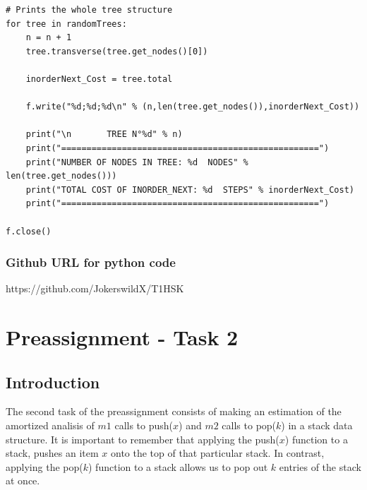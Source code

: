 \documentclass[12p]{report}
\begin{document}
\begin{lstlisting}
# Prints the whole tree structure
for tree in randomTrees:
	n = n + 1
	tree.transverse(tree.get_nodes()[0])

	inorderNext_Cost = tree.total

	f.write("%d;%d;%d\n" % (n,len(tree.get_nodes()),inorderNext_Cost))

	print("\n		TREE N°%d" % n)
	print("===================================================")
	print("NUMBER OF NODES IN TREE: %d  NODES" % len(tree.get_nodes()))
	print("TOTAL COST OF INORDER_NEXT: %d  STEPS" % inorderNext_Cost)
	print("===================================================")	

f.close()
\end{lstlisting}
 
\bigskip

  \subsection{Github URL for python code}
https://github.com/JokerswildX/T1HSK



  \chapter{Preassignment - Task 2}			%

 
  \section{Introduction}			%

  \large The second task of the preassignment consists of making an estimation of the amortized analisis of $m1$ calls to push($x$) and $m2$ calls to pop($k$) in a stack data structure. It is important to remember that applying the push($x$) function to a stack, pushes an item $x$ onto the top of that particular stack. In contrast, applying the pop($k$) function to a stack allows us to pop out $k$ entries of the stack at once. 
\end{document}
